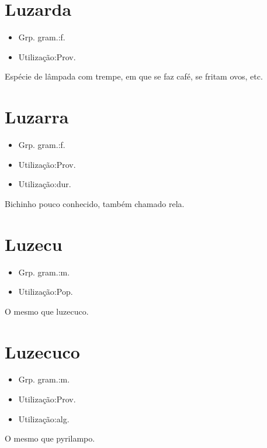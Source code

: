 \section{Luzarda}
\begin{itemize}
\item {Grp. gram.:f.}
\end{itemize}
\begin{itemize}
\item {Utilização:Prov.}
\end{itemize}
Espécie de lâmpada com trempe, em que se faz café, se fritam ovos, etc.
\section{Luzarra}
\begin{itemize}
\item {Grp. gram.:f.}
\end{itemize}
\begin{itemize}
\item {Utilização:Prov.}
\end{itemize}
\begin{itemize}
\item {Utilização:dur.}
\end{itemize}
Bichinho pouco conhecido, também chamado \textunderscore rela\textunderscore .
\section{Luzecu}
\begin{itemize}
\item {Grp. gram.:m.}
\end{itemize}
\begin{itemize}
\item {Utilização:Pop.}
\end{itemize}
O mesmo que \textunderscore luzecuco\textunderscore .
\section{Luzecuco}
\begin{itemize}
\item {Grp. gram.:m.}
\end{itemize}
\begin{itemize}
\item {Utilização:Prov.}
\end{itemize}
\begin{itemize}
\item {Utilização:alg.}
\end{itemize}
O mesmo que \textunderscore pyrilampo\textunderscore .
